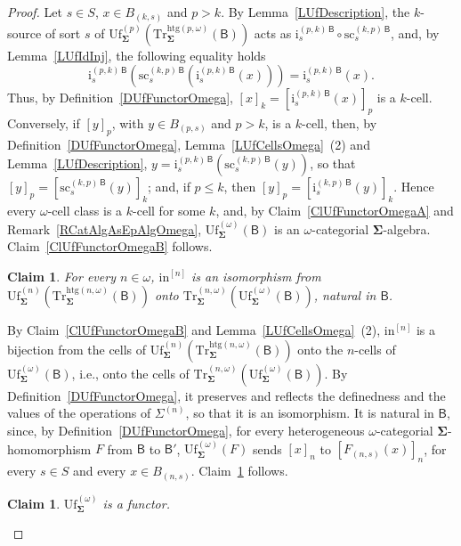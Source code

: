 \documentclass[a4paper, reqno]{amsbook}
\newcommand{\sig}[1]{\mathbf{#1}}             %
\newcommand{\calg}[1]{\boldsymbol{\mathsf{#1}}} %
\newcommand{\htg}{\mathrm{htg}}                %
\newcommand{\src}{\mathrm{sc}}
\newcommand{\Uf}{\mathrm{Uf}}
\newcommand{\Tr}{\mathrm{Tr}}
\theoremstyle{plain}
\newtheorem{claim}[theorem]{Claim}
\theoremstyle{definition}
\begin{document}
\begin{proof}
Let $s\in S$, $x\in B_{(k,s)}$ and $p>k$.
By Lemma~\ref{LUfDescription}, the $k$-source of sort $s$ of $\Uf^{(p)}_{\sig{\Sigma}}(\Tr^{\htg(p,\omega)}_{\sig{\Sigma}}(\calg{B}))$ acts as $\mathrm{i}^{(p,k)\,\calg{B}}_{s}\circ\src^{(k,p)\,\calg{B}}_{s}$, and, by Lemma~\ref{LUfIdInj}, the following equality holds
$$
\mathrm{i}^{(p,k)\,\calg{B}}_{s}\left(\src^{(k,p)\,\calg{B}}_{s}\left(\mathrm{i}^{(p,k)\,\calg{B}}_{s}(x)\right)\right)
=
\mathrm{i}^{(p,k)\,\calg{B}}_{s}(x).
$$
Thus, by Definition~\ref{DUfFunctorOmega}, $[x]_{k}=[\mathrm{i}^{(p,k)\,\calg{B}}_{s}(x)]_{p}$ is a $k$-cell.
Conversely, if $[y]_{p}$, with $y\in B_{(p,s)}$ and $p>k$, is a $k$-cell, then, by Definition~\ref{DUfFunctorOmega}, Lemma~\ref{LUfCellsOmega}~(2) and Lemma~\ref{LUfDescription}, $y=\mathrm{i}^{(p,k)\,\calg{B}}_{s}(\src^{(k,p)\,\calg{B}}_{s}(y))$, so that $[y]_{p}=[\src^{(k,p)\,\calg{B}}_{s}(y)]_{k}$; and, if $p\leq k$, then $[y]_{p}=[\mathrm{i}^{(k,p)\,\calg{B}}_{s}(y)]_{k}$.
Hence every $\omega$-cell class is a $k$-cell for some $k$, and, by Claim~\ref{ClUfFunctorOmegaA} and Remark~\ref{RCatAlgAsEpAlgOmega}, $\Uf^{(\omega)}_{\sig{\Sigma}}(\calg{B})$ is an $\omega$-categorial $\sig{\Sigma}$-algebra.
Claim~\ref{ClUfFunctorOmegaB} follows.

\begin{claim}\label{ClUfFunctorOmegaC}
For every $n\in\omega$, $\mathrm{in}^{[n]}$ is an isomorphism from $\Uf^{(n)}_{\sig{\Sigma}}(\Tr^{\htg(n,\omega)}_{\sig{\Sigma}}(\calg{B}))$ onto $\Tr^{(n,\omega)}_{\sig{\Sigma}}(\Uf^{(\omega)}_{\sig{\Sigma}}(\calg{B}))$, natural in $\calg{B}$.
\end{claim}

By Claim~\ref{ClUfFunctorOmegaB} and Lemma~\ref{LUfCellsOmega}~(2), $\mathrm{in}^{[n]}$ is a bijection from the cells of $\Uf^{(n)}_{\sig{\Sigma}}(\Tr^{\htg(n,\omega)}_{\sig{\Sigma}}(\calg{B}))$ onto the $n$-cells of $\Uf^{(\omega)}_{\sig{\Sigma}}(\calg{B})$, i.e., onto the cells of $\Tr^{(n,\omega)}_{\sig{\Sigma}}(\Uf^{(\omega)}_{\sig{\Sigma}}(\calg{B}))$.
By Definition~\ref{DUfFunctorOmega}, it preserves and reflects the definedness and the values of the operations of $\Sigma^{(n)}$, so that it is an isomorphism.
It is natural in $\calg{B}$, since, by Definition~\ref{DUfFunctorOmega}, for every heterogeneous $\omega$-categorial $\sig{\Sigma}$-homomorphism $F$ from $\calg{B}$ to $\calg{B}'$, $\Uf^{(\omega)}_{\sig{\Sigma}}(F)$ sends $[x]_{n}$ to $[F_{(n,s)}(x)]_{n}$, for every $s\in S$ and every $x\in B_{(n,s)}$.
Claim~\ref{ClUfFunctorOmegaC} follows.

\begin{claim}\label{ClUfFunctorOmegaD}
$\Uf^{(\omega)}_{\sig{\Sigma}}$ is a functor.
\end{claim}


\end{proof}
\end{document}
